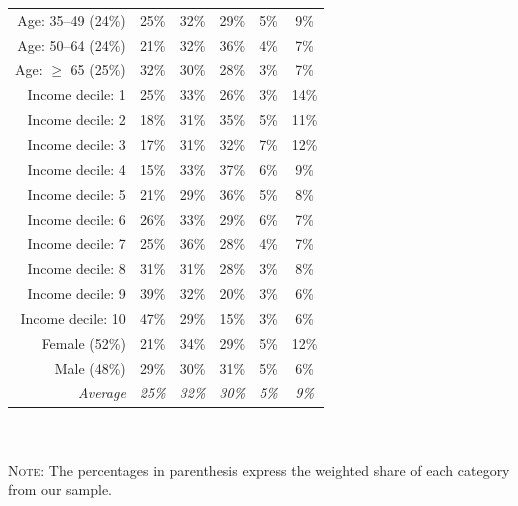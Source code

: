 \documentclass[english,5p,authoryear]{elsarticle}
\begin{document}
\begin{appendices}
\begin{spacing}{1}
\begin{table}[ht]
{\begin{tabular}{rccccc}
  Age: 35--49 (24\%) & 25\% & 32\% & 29\% & 5\% & 9\% \\ 
  Age: 50--64 (24\%) & 21\% & 32\% & 36\% & 4\% & 7\% \\ 
  Age: $\geq$ 65 (25\%) & 32\% & 30\% & 28\% & 3\% & 7\% \\
  \hline
  Income decile: 1 & 25\% & 33\% & 26\% & 3\% & 14\% \\ 
  Income decile: 2 & 18\% & 31\% & 35\% & 5\% & 11\% \\
  Income decile: 3 & 17\% & 31\% & 32\% & 7\% & 12\% \\
  Income decile: 4 & 15\% & 33\% & 37\% & 6\% & 9\% \\
  Income decile: 5 & 21\% & 29\% & 36\% & 5\% & 8\% \\
  Income decile: 6 & 26\% & 33\% & 29\% & 6\% & 7\% \\
  Income decile: 7 & 25\% & 36\% & 28\% & 4\% & 7\% \\
  Income decile: 8 & 31\% & 31\% & 28\% & 3\% & 8\% \\
  Income decile: 9 & 39\% & 32\% & 20\% & 3\% & 6\% \\
  Income decile: 10 & 47\% & 29\% & 15\% & 3\% & 6\% \\
  \hline
  Female (52\%) & 21\% & 34\% & 29\% & 5\% & 12\% \\
  Male (48\%) & 29\% & 30\% & 31\% & 5\% & 6\% \\
  \hline
  \textit{Average} & \textit{25\%} & \textit{32\%} & \textit{30\%} & \textit{5\%} & \textit{9\%} \\ 
   \hline \hline
\end{tabular}
}
\\ $\quad$ \\
{\footnotesize \textsc{Note:} The percentages in parenthesis express the weighted share of each category from our sample.}
\label{tab:gilets_jaunes_agglo}
\end{table}
\end{spacing}




\end{appendices}
\end{document}
